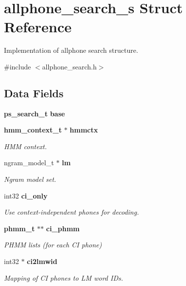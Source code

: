 \section{allphone\+\_\+search\+\_\+s Struct Reference}
\label{structallphone__search__s}


Implementation of allphone search structure.  




{\ttfamily \#include $<$allphone\+\_\+search.\+h$>$}

\subsection*{Data Fields}
\begin{DoxyCompactItemize}
\item 
\mbox{\label{structallphone__search__s_aed4067ba47369dcbb84633cb436c209a}} 
\textbf{ ps\+\_\+search\+\_\+t} {\bfseries base}
\item 
\textbf{ hmm\+\_\+context\+\_\+t} $\ast$ \textbf{ hmmctx}
\begin{DoxyCompactList}\small\item\em H\+MM context. \end{DoxyCompactList}\item 
\mbox{\label{structallphone__search__s_ac1220a564a57a418312800df44bd95ca}} 
ngram\+\_\+model\+\_\+t $\ast$ \textbf{ lm}
\begin{DoxyCompactList}\small\item\em Ngram model set. \end{DoxyCompactList}\item 
\mbox{\label{structallphone__search__s_ab4d9470249d15abca8e9fd01f1d437a7}} 
int32 \textbf{ ci\+\_\+only}
\begin{DoxyCompactList}\small\item\em Use context-\/independent phones for decoding. \end{DoxyCompactList}\item 
\mbox{\label{structallphone__search__s_a2646c8ad402da8a644ecebd28386de0d}} 
\textbf{ phmm\+\_\+t} $\ast$$\ast$ \textbf{ ci\+\_\+phmm}
\begin{DoxyCompactList}\small\item\em P\+H\+MM lists (for each CI phone) \end{DoxyCompactList}\item 
\mbox{\label{structallphone__search__s_a9021eb4d9645cc3138535dfad8272601}} 
int32 $\ast$ \textbf{ ci2lmwid}
\begin{DoxyCompactList}\small\item\em Mapping of CI phones to LM word I\+Ds. \end{DoxyCompactList}\item 
$$
\end{DoxyCompactItemize}
